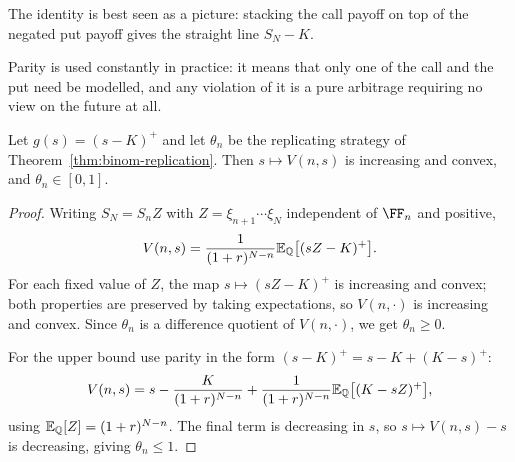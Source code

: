 \documentclass[a4paper]{scrartcl}
\newcommand{\QQ}{\mathbb{Q}}
\begin{document}
The identity is best seen as a picture: stacking the call payoff on top of the negated put payoff gives the straight line $S_N - K$.

\begin{center}
\end{center}

Parity is used constantly in practice: it means that only one of the call and the put need be modelled, and any violation of it is a pure arbitrage requiring no view on the future at all.

\begin{proposition}
	Let $g(s) = (s-K)^+$ and let $\theta_n$ be the replicating strategy of Theorem~\ref{thm:binom-replication}. Then $s \mapsto V(n,s)$ is increasing and convex, and $\theta_n \in [0,1]$.
\end{proposition}

\begin{proof}
	Writing $S_N = S_n Z$ with $Z = \xi_{n+1}\cdots\xi_N$ independent of $\FF_n$ and positive,
	$$
	V(n,s) = \frac{1}{(1+r)^{N-n}}\EE_\QQ\big[(sZ-K)^+\big].
	$$
	For each fixed value of $Z$, the map $s\mapsto (sZ-K)^+$ is increasing and convex; both properties are preserved by taking expectations, so $V(n,\cdot)$ is increasing and convex. Since $\theta_n$ is a difference quotient of $V(n,\cdot)$, we get $\theta_n \geq 0$.

	For the upper bound use parity in the form $(s-K)^+ = s - K + (K-s)^+$:
	$$
	V(n,s) = s - \frac{K}{(1+r)^{N-n}} + \frac{1}{(1+r)^{N-n}}\EE_\QQ\big[(K-sZ)^+\big],
	$$
	using $\EE_\QQ[Z] = (1+r)^{N-n}$. The final term is decreasing in $s$, so $s\mapsto V(n,s) - s$ is decreasing, giving $\theta_n \leq 1$.
\end{proof}
\end{document}
